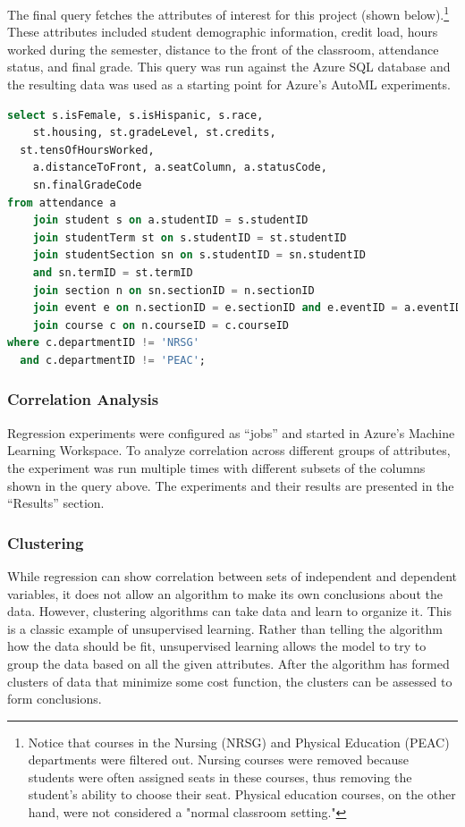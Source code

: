 The final query fetches the attributes of interest for this project (shown below).\footnote{Notice that courses in the Nursing (NRSG) and Physical Education (PEAC) departments were filtered out. Nursing courses were removed because students were often assigned seats in these courses, thus removing the student's ability to choose their seat. Physical education courses, on the other hand, were not considered a "normal classroom setting."} These attributes included student demographic information, credit load, hours worked during the semester, distance to the front of the classroom, attendance status, and final grade. This query was run against the Azure SQL database and the resulting data was used as a starting point for Azure's AutoML experiments.
\begin{lstlisting}[language=SQL]
select s.isFemale, s.isHispanic, s.race,
	st.housing, st.gradeLevel, st.credits, 
  st.tensOfHoursWorked,
	a.distanceToFront, a.seatColumn, a.statusCode,
	sn.finalGradeCode
from attendance a
	join student s on a.studentID = s.studentID 
	join studentTerm st on s.studentID = st.studentID
	join studentSection sn on s.studentID = sn.studentID 
    and sn.termID = st.termID
	join section n on sn.sectionID = n.sectionID
	join event e on n.sectionID = e.sectionID and e.eventID = a.eventID
	join course c on n.courseID = c.courseID
where c.departmentID != 'NRSG' 
  and c.departmentID != 'PEAC';
\end{lstlisting}

\subsubsection{Correlation Analysis}
Regression experiments were configured as ``jobs'' and started in Azure's Machine Learning Workspace. To analyze correlation across different groups of attributes, the experiment was run multiple times with different subsets of the columns shown in the query above. The experiments and their results are presented in the ``Results'' section.
\subsubsection{Clustering}
While regression can show correlation between sets of independent and dependent variables, it does not allow an algorithm to make its own conclusions about the data. However, clustering algorithms can take data and learn to organize it. This is a classic example of unsupervised learning. Rather than telling the algorithm how the data should be fit, unsupervised learning allows the model to try to group the data based on all the given attributes. After the algorithm has formed clusters of data that minimize some cost function, the clusters can be assessed to form conclusions.

